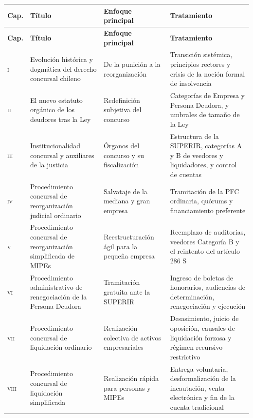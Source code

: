 {\small
\begin{longtable}{@{}p{}p{}p{}p{}@{}}
\toprule
\textbf{Cap.} & \textbf{Título} & \textbf{Enfoque principal} & \textbf{Tratamiento} \\
\midrule
\endfirsthead
\toprule
\textbf{Cap.} & \textbf{Título} & \textbf{Enfoque principal} & \textbf{Tratamiento} \\
\midrule
\endhead
\bottomrule
\endfoot

\textsc{i} & Evolución histórica y dogmática del derecho concursal chileno
& De la punición a la reorganización
& Transición sistémica, principios rectores y crisis de la noción formal de insolvencia \\
\addlinespace
\textsc{ii} & El nuevo estatuto orgánico de los deudores tras la Ley \Nro 21.563
& Redefinición subjetiva del concurso
& Categorías de Empresa y Persona Deudora, y umbrales de tamaño de la Ley \Nro 20.416 \\
\addlinespace
\textsc{iii} & Institucionalidad concursal y auxiliares de la justicia
& Órganos del concurso y su fiscalización
& Estructura de la SUPERIR, categorías A y B de veedores y liquidadores, y control de cuentas \\
\addlinespace
\textsc{iv} & Procedimiento concursal de reorganización judicial ordinario
& Salvataje de la mediana y gran empresa
& Tramitación de la PFC ordinaria, quórums y financiamiento preferente \\
\addlinespace
\textsc{v} & Procedimiento concursal de reorganización simplificada de MIPEs
& Reestructuración ágil para la pequeña empresa
& Reemplazo de auditorías, veedores Categoría B y el reintento del artículo 286 S \\
\addlinespace
\textsc{vi} & Procedimiento administrativo de renegociación de la Persona Deudora
& Tramitación gratuita ante la SUPERIR
& Ingreso de boletas de honorarios, audiencias de determinación, renegociación y ejecución \\
\addlinespace
\textsc{vii} & Procedimiento concursal de liquidación ordinario
& Realización colectiva de activos empresariales
& Desasimiento, juicio de oposición, causales de liquidación forzosa y régimen recursivo restrictivo \\
\addlinespace
\textsc{viii} & Procedimiento concursal de liquidación simplificada
& Realización rápida para personas y MIPEs
& Entrega voluntaria, desformalización de la incautación, venta electrónica y fin de la cuenta tradicional \\

\end{longtable}}
